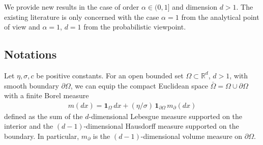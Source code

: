 \documentclass[11pt,a4paper]{article}
\begin{document}
We provide new results in the case of order $\alpha \in (0,1]$ and dimension $d>1$. The existing literature is only concerned with the case $\alpha=1$ from the analytical point of view and $\alpha=1$, $d=1$ from the probabilistic viewpoint.


\subsection{Notations}
\label{sec:intro}

Let $\eta, \sigma, c$ be positive constants. For an open bounded set $\Omega \subset \mathbb{R}^d$, $d>1$, with smooth boundary $\partial \Omega$, we can equip the compact Euclidean space $\bar{\Omega} = \Omega \cup \partial \Omega$ with a finite Borel measure
\begin{align}
m(dx) = \mathbf{1}_\Omega\, dx + (\eta/\sigma)\, \mathbf{1}_{\partial \Omega} \, m_\partial(dx)
\label{mMeasure}
\end{align}
defined as the sum of the $d$-dimensional Lebesgue measure supported on the interior and the $(d-1)$-dimensional Hausdorff measure supported on the boundary. In particular, $m_\partial$ is the $(d-1)$-dimensional volume measure on $\partial \Omega$. 
\end{document}
